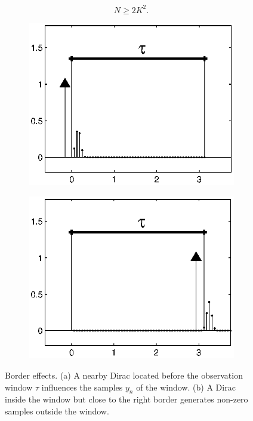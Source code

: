 \documentclass{article}
\begin{document}
\begin{equation}
N \geq 2K^2.
\end{equation}

\begin{figure}[t]
\centering
\begin{subfigure}{.22\textwidth}
\includegraphics[width=\linewidth]{figures/border_effect_left}
\caption{}
\end{subfigure}
\begin{subfigure}{.22\textwidth}
\includegraphics[width=\linewidth]{figures/border_effect_right}
\caption{}
\end{subfigure}
\caption{Border effects. (a) A nearby Dirac located before the observation window 
$\tau$ influences the samples $y_n$ of the window. (b) A Dirac inside the window 
but close to the right border generates non-zero samples outside the window.}
\label{fig:border_effects}
\end{figure}
\end{document}
